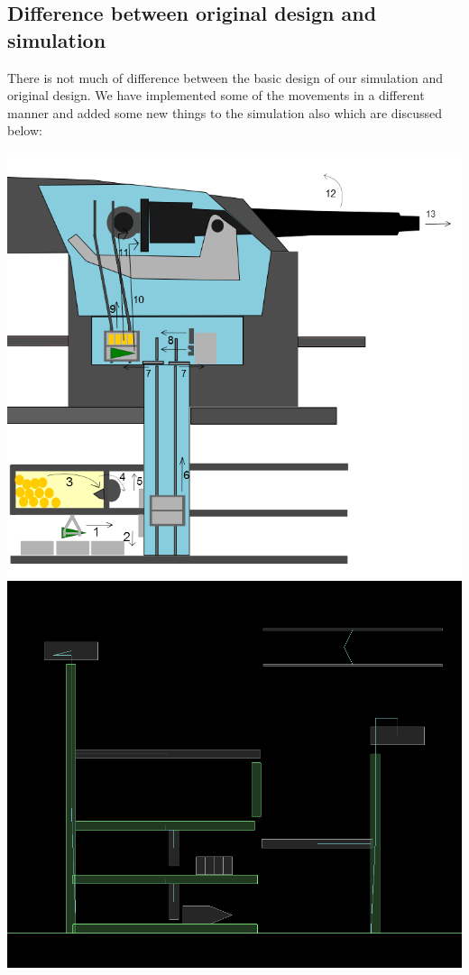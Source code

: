 \documentclass[11pt]{article}
\begin{document}
\subsection{Difference between original design and simulation}
There is not much of difference between the basic design of our simulation and original design.
We have implemented some of the movements in a different manner and added some new things to the simulation also
which are discussed below:
 \begin{center}
 \includegraphics[scale=0.3]{images/original}
 \includegraphics[scale=0.25]{images/simulation}
 \end{center}
\end{document}

